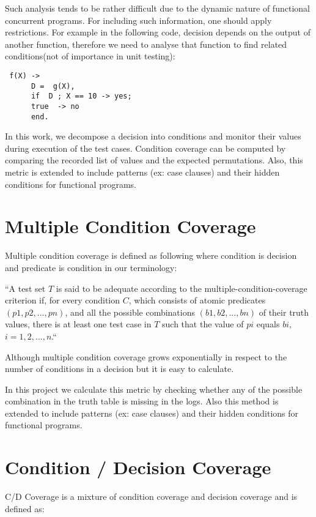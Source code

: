 \documentclass[12pt,a4paper]{report}
\begin{document}
Such analysis tends to be rather difficult due to the dynamic nature of functional concurrent programs. For including such information, one should apply
 restrictions. For example in the following code, decision depends on the output of another function, therefore we need to analyse that function to find
 related conditions(not of importance in unit testing):

\begin{lstlisting}
 f(X) -> 
      D =  g(X),
      if  D ; X == 10 -> yes;
	  true  -> no
      end.
\end{lstlisting}

In this work, we decompose a decision into conditions and monitor their values during execution of the test cases. Condition coverage can be computed
 by comparing the recorded list of values and the expected permutations. Also, this metric is extended to include patterns (ex: case clauses) and their
 hidden conditions for functional programs. %

\section{Multiple Condition Coverage}
Multiple condition coverage is defined as following where condition is decision and predicate is condition in our terminology:

“A test set $T$ is said to be adequate according to the multiple-condition-coverage criterion if, for every condition $C$, which consists of atomic
 predicates $(p1, p2,  . . .  , pn)$, and all the possible combinations $(b1, b2,  . . .  , bn)$ of their truth values, there is at least one test case in
 $T$ such that the value of $pi$ equals $bi$, $i = 1, 2,  .  .  .  , n$.“\cite{Zhu:1997:SUT:267580.267590}

Although multiple condition coverage grows exponentially in respect to the number of conditions in a decision but it is easy to calculate.

In this project we calculate this metric by checking whether any of the possible combination in the truth table is missing in the logs. Also this method is
 extended to include patterns (ex: case clauses) and their hidden conditions for functional programs.

\section{Condition / Decision Coverage}
C/D Coverage is a mixture of condition coverage and decision coverage and is defined as:
\end{document}
